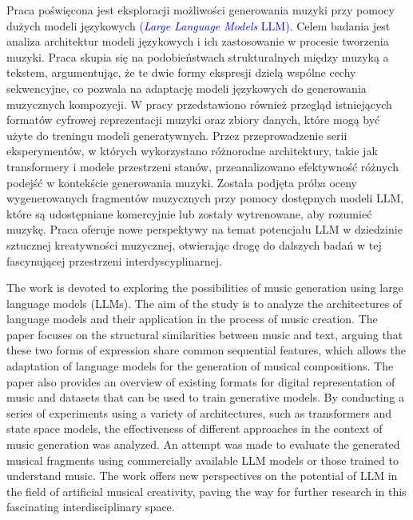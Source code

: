 \documentclass[data-science]{agh-wi} %
\author{Filip Ręka}
\begin{document}
\frontmatter %
\maketitle %

\begin{abstractPL}
    Praca poświęcona jest eksploracji możliwości generowania muzyki przy pomocy dużych modeli językowych \textcolor{blue}{(\textit{Large Language Models} LLM)}. Celem badania jest analiza architektur modeli językowych i ich zastosowanie w procesie tworzenia muzyki. Praca skupia się na podobieństwach strukturalnych między muzyką a tekstem, argumentując, że te dwie formy ekspresji dzielą wspólne cechy sekwencyjne, co pozwala na adaptację modeli językowych do generowania muzycznych kompozycji. W pracy przedstawiono również przegląd istniejących formatów cyfrowej reprezentacji muzyki oraz zbiory danych, które mogą być użyte do treningu modeli generatywnych. Przez przeprowadzenie serii eksperymentów, w których wykorzystano różnorodne architektury, takie jak transformery i modele przestrzeni stanów, przeanalizowano efektywność różnych podejść w kontekście generowania muzyki. Została podjęta próba oceny wygenerowanych fragmentów muzycznych przy pomocy dostępnych modeli LLM, które są udostępniane komercyjnie lub zostały wytrenowane, aby rozumieć muzykę. Praca oferuje nowe perspektywy na temat potencjału LLM w dziedzinie sztucznej kreatywności muzycznej, otwierając drogę do dalszych badań w tej fascynującej przestrzeni interdyscyplinarnej.
\end{abstractPL}
\begin{abstractEN}
    The work is devoted to exploring the possibilities of music generation using large language models (LLMs). The aim of the study is to analyze the architectures of language models and their application in the process of music creation. The paper focuses on the structural similarities between music and text, arguing that these two forms of expression share common sequential features, which allows the adaptation of language models for the generation of musical compositions. The paper also provides an overview of existing formats for digital representation of music and datasets that can be used to train generative models. By conducting a series of experiments using a variety of architectures, such as transformers and state space models, the effectiveness of different approaches in the context of music generation was analyzed. An attempt was made to evaluate the generated musical fragments using commercially available LLM models or those trained to understand music. The work offers new perspectives on the potential of LLM in the field of artificial musical creativity, paving the way for further research in this fascinating interdisciplinary space.
\end{abstractEN}
\end{document}
